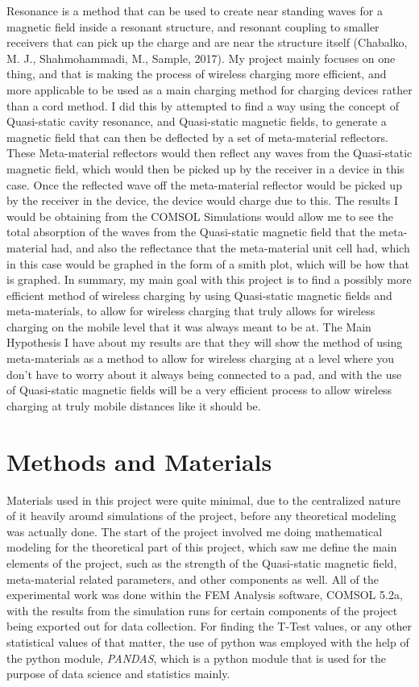 \documentclass[]{article}
\begin{document}
Resonance is a method that can be used to create near standing waves for a magnetic field inside a resonant structure, and resonant coupling to smaller receivers that can pick up the charge and are near the structure itself (Chabalko, M. J., Shahmohammadi, M., Sample, 2017).
\linebreak
My project mainly focuses on one thing, and that is making the process of wireless charging more efficient, and more applicable to be used as a main charging method for charging devices rather than a cord method. I did this by attempted to find a way using the concept of Quasi-static cavity resonance, and Quasi-static magnetic fields, to generate a magnetic field that can then be deflected by a set of meta-material reflectors. These Meta-material reflectors would then reflect any waves from the Quasi-static magnetic field, which would then be picked up by the receiver in a device in this case. Once the reflected wave off the meta-material reflector would be picked up by the receiver in the device, the device would charge due to this. The results I would be obtaining from the COMSOL Simulations would allow me to see the total absorption of the waves from the Quasi-static magnetic field that the meta-material had, and also the reflectance that the meta-material unit cell had, which in this case would be graphed in the form of a smith plot, which will be how that is graphed. In summary, my main goal with this project is to find a possibly more efficient method of wireless charging by using Quasi-static magnetic fields and meta-materials, to allow for wireless charging that truly allows for wireless charging on the mobile level that it was always meant to be at. The Main Hypothesis I have about my results are that they will show the method of using meta-materials as a method to allow for wireless charging at a level where you don't have to worry about it always being connected to a pad, and with the use of Quasi-static magnetic fields will be a very efficient process to allow wireless charging at truly mobile distances like it should be.

\section*{Methods and Materials} 
Materials used in this project were quite minimal, due to the centralized nature of it heavily around simulations of the project, before any theoretical modeling was actually done. The start of the project involved me doing mathematical modeling for the theoretical part of this project, which saw me define the main elements of the project, such as the strength of the Quasi-static magnetic field, meta-material related parameters, and other components as well. All of the experimental work was done within the FEM Analysis software, COMSOL 5.2a, with the results from the simulation runs for certain components of the project being exported out for data collection. For finding the T-Test values, or any other statistical values of that matter, the use of python was employed with the help of the python module, \textit{PANDAS}, which is a python module that is used for the purpose of data science and statistics mainly.
\end{document}
